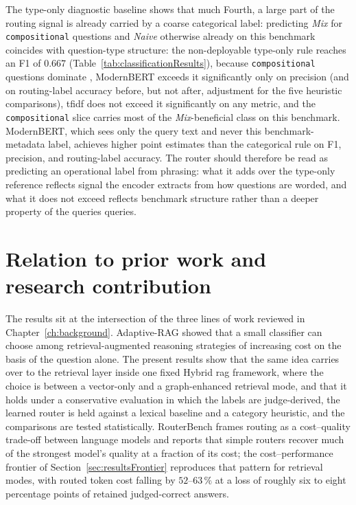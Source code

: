 \documentclass[english, bibtex]{kththesis}               %
\numberwithin{listing}{chapter}
\providecommand{\DIFaddtex}[1]{{\protect\color{blue} \sf #1}} %
\providecommand{\DIFdeltex}[1]{{\protect\color{red} \scriptsize #1}} %
\providecommand{\DIFaddbegin}{} %
\providecommand{\DIFaddend}{} %
\providecommand{\DIFdelbegin}{} %
\providecommand{\DIFdelend}{} %
\providecommand{\DIFadd}[1]{\texorpdfstring{\DIFaddtex{#1}}{#1}} %
\providecommand{\DIFdel}[1]{\texorpdfstring{\DIFdeltex{#1}}{}} %
\begin{document}
\DIFdelbegin \DIFdel{The type-only diagnostic baseline shows that much }\DIFdelend \DIFaddbegin \DIFadd{Fourth, a large part }\DIFaddend of the routing signal \DIFdelbegin \DIFdel{is already carried by a coarse categorical label: predicting \emph{Mix} for \texttt{compositional} questions and \emph{Naive} otherwise already }\DIFdelend \DIFaddbegin \DIFadd{on this benchmark coincides with question-type structure: the non-deployable type-only rule }\DIFaddend reaches an F1 of $0.667$\DIFdelbegin \DIFdel{(Table~\ref{tab:classificationResults}), because \texttt{compositional} questions dominate }\DIFdelend \DIFaddbegin \DIFadd{, ModernBERT exceeds it significantly only on precision (and on routing-label accuracy before, but not after, adjustment for the five heuristic comparisons), \gls{tfidf} does not exceed it significantly on any metric, and the \texttt{compositional} slice carries most of }\DIFaddend the \emph{Mix}-beneficial \DIFdelbegin \DIFdel{class on this benchmark. ModernBERT, which sees only the query text and never this benchmark-metadata label, achieves higher point estimates than the categorical rule on F1, precision, and routing-label accuracy. The router should therefore be read as predicting an operational label from phrasing: what it adds over the type-only reference reflects signal the encoder extracts from how questions are worded, and what it does not exceed reflects benchmark structure rather than a deeper property of the queries}\DIFdelend \DIFaddbegin \DIFadd{queries.
}

\section{Relation to prior work and research contribution}
\label{sec:discPriorWork}

\DIFadd{The results sit at the intersection of the three lines of work reviewed in Chapter~\ref{ch:background}. Adaptive-RAG \cite{jeong2024adaptiverag} showed that a small classifier can choose among retrieval-augmented reasoning strategies of increasing cost on the basis of the question alone. The present results show that the same idea carries over to the retrieval layer inside one fixed Hybrid \gls{rag} framework, where the choice is between a vector-only and a graph-enhanced retrieval mode, and that it holds under a conservative evaluation in which the labels are judge-derived, the learned router is held against a lexical baseline and a category heuristic, and the comparisons are tested statistically. RouterBench \cite{hu2024routerbench} frames routing as a cost--quality trade-off between language models and reports that simple routers recover much of the strongest model's quality at a fraction of its cost; the cost--performance frontier of Section~\ref{sec:resultsFrontier} reproduces that pattern for retrieval modes, with routed token cost falling by $52$--$63\,\%$ at a loss of roughly six to eight percentage points of retained judged-correct answers}\DIFaddend .
\end{document}
